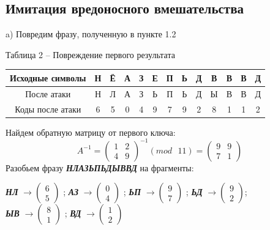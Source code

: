 \documentclass[a5paper, 10pt]{article}
\theoremstyle{definition}
\theoremstyle{plain}
\theoremstyle{remark}
\begin{document}
\subsection{Имитация вредоносного вмешательства}
 a) Повредим фразу, полученную в пункте 1.2
\begin{center}
Таблица 2 -- Повреждение первого результата\\
\begin{tabular}{ |c|c|c|c|c|c|c|c|c|c|c|c|c| } 
 \hline
Исходные символы & Н & Ё & А & З & Е  & П & Ь  & Д & В  & В & В  & Д\\
\hline
После атаки  & Н & Л & А & З & Ь  & П & Ь  & Д & Ы  & В & В  & Д\\
 \hline
Коды после атаки & 6 & 5 & 0 & 4 & 9  & 7 & 9  & 2 & 8  & 1 & 1  & 2  \\
 \hline
\end{tabular}
\end{center}
Найдем обратную матрицу от первого ключа:
\begin{equation}
A^{-1} =
\begin{pmatrix}
1 & 2 \\
4 & 9
\end{pmatrix} ^{-1} (mod \text{ }11)
= 
\begin{pmatrix}
 9 & 9\\
 7 &  1
\end{pmatrix}
\end{equation}
Разобьем фразу  \textbf{\textit{НЛАЗЬПЬДЫВВД}} на фрагменты:
\begin{center}
\textbf{\textit{НЛ}}
 $ \to \begin{pmatrix}
 6\\
5
\end{pmatrix} $  ;
 \textbf{\textit{АЗ}} $\to \begin{pmatrix}
 0\\
4
\end{pmatrix} $ ;
 \textbf{\textit{ЬП}} $\to \begin{pmatrix}
 9\\
7
\end{pmatrix} $ ;
 \textbf{\textit{ЬД}}  $ \to \begin{pmatrix}
9\\
2
\end{pmatrix}$; \\
\textbf{\textit{ЫВ}} $\to \begin{pmatrix}
 8\\
1
\end{pmatrix} $  ;
 \textbf{\textit{ВД}} $ \to \begin{pmatrix}
 1\\
2
\end{pmatrix}$ \\
\end{center}
\end{document}
